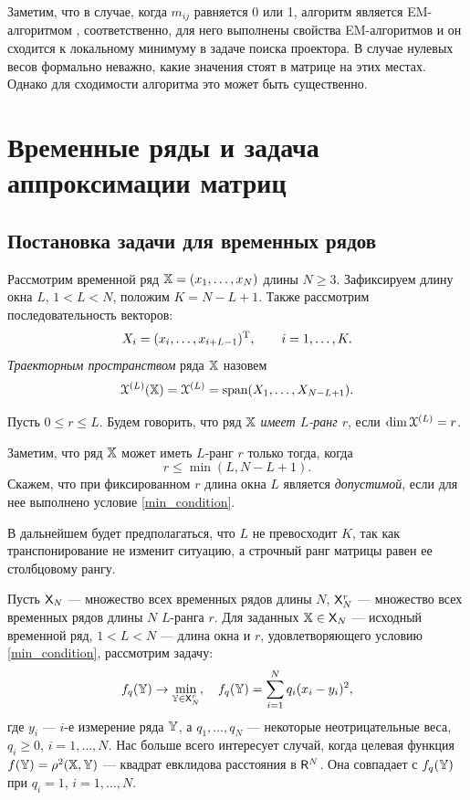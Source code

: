 \documentclass[12pt,a4paper,fleqn,leqno]{article}
\begin{document}
Заметим, что в случае, когда $m_{ij}$ равняется 0 или 1, алгоритм является EM-алгоритмом \cite{Srebro2003},
соответственно, для него выполнены свойства EM-алгоритмов и он сходится к локальному минимуму в задаче поиска проектора.
В случае нулевых весов формально неважно, какие значения стоят в матрице на этих местах. Однако для сходимости алгоритма
это может быть существенно.

\section{Временные ряды и задача аппроксимации матриц}
\label{sec:ts_matrices}
\subsection{Постановка задачи для временных рядов}
Рассмотрим временной ряд $\mathbb{X} = (x_1, \ldots, x_N)$ длины $N \ge 3$. Зафиксируем длину окна $L$, $1 < L < N$, положим $K = N - L + 1$. Также рассмотрим последовательность векторов:
\begin{equation}\label{l_lagged}
X_i = (x_i, \ldots, x_{i + L - 1})^{\mathrm{T}}, \qquad i = 1, \ldots, K.
\end{equation}
\emph{Траекторным пространством} ряда $\mathbb{X}$ назовем $$\EuScript{X}^{(L)}(\mathbb{X}) = \EuScript{X}^{(L)} = \text{span}(X_1, \ldots, X_{N-L+1}).$$

\begin{definition}
Пусть $0 \le r \le L$. Будем говорить, что ряд $\mathbb{X}$ \emph{имеет $L$-ранг $r$}, если $\dim \EuScript{X}^{(L)} = r$.
\end{definition}

Заметим, что ряд $\mathbb{X}$ может иметь $L$-ранг $r$ только тогда, когда
\begin{equation}
r \le \min(L, N-L+1). \label{min_condition}
\end{equation}
Скажем, что при фиксированном $r$ длина окна $L$ является \emph{допустимой}, если для нее выполнено условие \eqref{min_condition}.

В дальнейшем будет предполагаться, что $L$ не превосходит $K$, так как транспонирование не изменит ситуацию, а строчный ранг матрицы равен ее столбцовому рангу.

Пусть $\mathsf{X}_N$ --- множество всех временных рядов длины $N$, $\mathsf{X}_N^r$ --- множество всех временных рядов длины $N$ $L$-ранга $r$. Для заданных $\mathbb{X} \in \mathsf{X}_N$ --- исходный временной ряд, $1 < L < N$ --- длина окна и $r$, удовлетворяющего условию \eqref{min_condition}, рассмотрим задачу:
\begin{equation} \label{L-rank_task}
f_q(\mathbb{Y}) \to \min_{\mathbb{Y} \in \mathsf{X}_N^r}, \quad f_q(\mathbb{Y}) = \sum \limits_{i=1}^N q_i(x_i - y_i)^2,
\end{equation}
где $y_i$ --- $i$-е измерение ряда $\mathbb{Y}$, а $q_1, \ldots, q_N$ --- некоторые неотрицательные веса, 
$q_i \ge 0$, $i = 1, \ldots, N$. Нас больше всего интересует случай, когда целевая функция $f(\mathbb{Y}) = \rho^2(\mathbb{X}, \mathbb{Y})$ --- квадрат евклидова расстояния в $\mathsf{R}^N$. Она совпадает с $f_q(\mathbb{Y})$ при $q_i = 1$, $i = 1, \ldots, N$.
\end{document}
